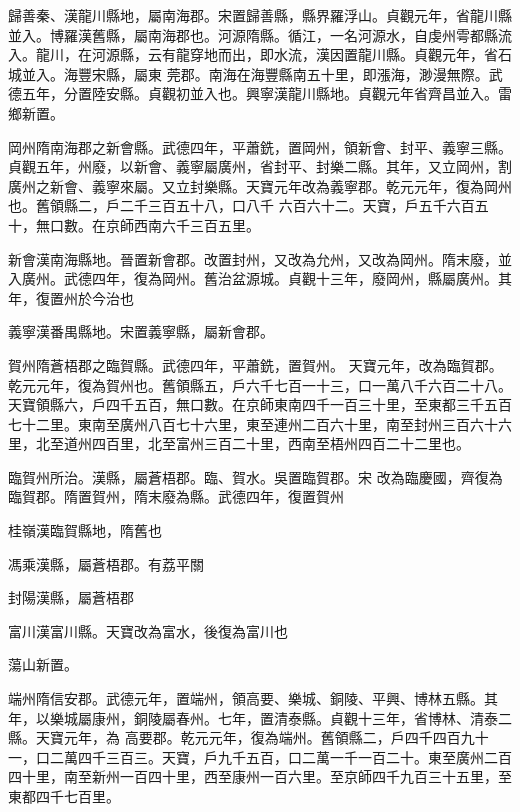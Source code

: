 \begin{pinyinscope}
 歸善秦、漢龍川縣地，屬南海郡。宋置歸善縣，縣界羅浮山。貞觀元年，省龍川縣並入。博羅漢舊縣，屬南海郡也。河源隋縣。循江，一名河源水，自虔州雩都縣流入。龍川，在河源縣，云有龍穿地而出，即水流，漢因置龍川縣。貞觀元年，省石城並入。海豐宋縣，屬東
 莞郡。南海在海豐縣南五十里，即漲海，渺漫無際。武德五年，分置陸安縣。貞觀初並入也。興寧漢龍川縣地。貞觀元年省齊昌並入。雷鄉新置。



 岡州隋南海郡之新會縣。武德四年，平蕭銑，置岡州，領新會、封平、義寧三縣。貞觀五年，州廢，以新會、義寧屬廣州，省封平、封樂二縣。其年，又立岡州，割廣州之新會、義寧來屬。又立封樂縣。天寶元年改為義寧郡。乾元元年，復為岡州也。舊領縣二，戶二千三百五十八，口八千
 六百六十二。天寶，戶五千六百五十，無口數。在京師西南六千三百五里。



 新會漢南海縣地。晉置新會郡。改置封州，又改為允州，又改為岡州。隋末廢，並入廣州。武德四年，復為岡州。舊治盆源城。貞觀十三年，廢岡州，縣屬廣州。其年，復置州於今治也



 義寧漢番禺縣地。宋置義寧縣，屬新會郡。



 賀州隋蒼梧郡之臨賀縣。武德四年，平蕭銑，置賀州。
 天寶元年，改為臨賀郡。乾元元年，復為賀州也。舊領縣五，戶六千七百一十三，口一萬八千六百二十八。天寶領縣六，戶四千五百，無口數。在京師東南四千一百三十里，至東都三千五百七十二里。東南至廣州八百七十六里，東至連州二百六十里，南至封州三百六十六里，北至道州四百里，北至富州三百二十里，西南至梧州四百二十二里也。



 臨賀州所治。漢縣，屬蒼梧郡。臨、賀水。吳置臨賀郡。宋
 改為臨慶國，齊復為臨賀郡。隋置賀州，隋末廢為縣。武德四年，復置賀州



 桂嶺漢臨賀縣地，隋舊也



 馮乘漢縣，屬蒼梧郡。有荔平關



 封陽漢縣，屬蒼梧郡



 富川漢富川縣。天寶改為富水，後復為富川也



 蕩山新置。



 端州隋信安郡。武德元年，置端州，領高要、樂城、銅陵、平興、博林五縣。其年，以樂城屬康州，銅陵屬春州。七年，置清泰縣。貞觀十三年，省博林、清泰二縣。天寶元年，為
 高要郡。乾元元年，復為端州。舊領縣二，戶四千四百九十一，口二萬四千三百三。天寶，戶九千五百，口二萬一千一百二十。東至廣州二百四十里，南至新州一百四十里，西至康州一百六里。至京師四千九百三十五里，至東都四千七百里。




\end{pinyinscope}
